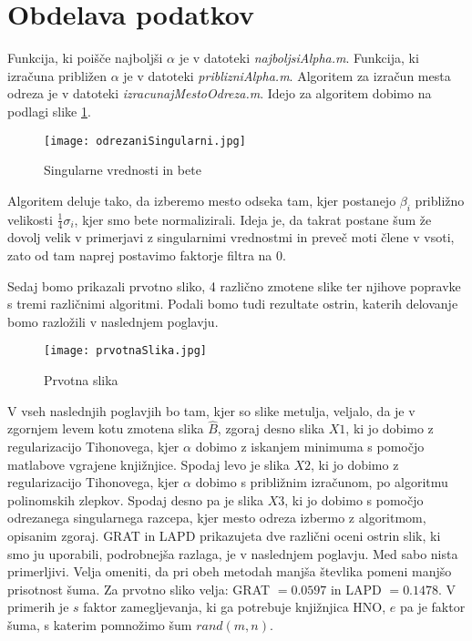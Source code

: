 \documentclass[a4paper,12pt]{article}
\begin{document}
\section{Obdelava podatkov}
Funkcija, ki poišče najboljši $\alpha$ je v datoteki \emph{najboljsiAlpha.m}. Funkcija, ki izračuna približen $\alpha$ je v datoteki \emph{priblizniAlpha.m}. Algoritem za izračun mesta odreza je v datoteki \emph{izracunajMestoOdreza.m}. Idejo za algoritem dobimo na podlagi  slike \ref{fig:sig}.
\begin{figure}[h]
	\texttt{[image: odrezaniSingularni.jpg]}
	\centering
	\caption{Singularne vrednosti in bete}
	\label{fig:sig}
\end{figure}
Algoritem deluje tako, da izberemo mesto odseka tam, kjer postanejo $\beta_i$ približno velikosti $\frac{1}{4}\sigma_i$, kjer smo bete normalizirali. Ideja je, da takrat postane šum že dovolj velik v primerjavi z singularnimi vrednostmi in preveč moti člene v vsoti, zato od tam naprej postavimo faktorje filtra na 0. 

Sedaj bomo prikazali prvotno sliko, 4 različno zmotene slike ter njihove popravke s tremi različnimi algoritmi. Podali bomo tudi rezultate ostrin, katerih delovanje bomo razložili v naslednjem poglavju.
\begin{figure}[h]
	\texttt{[image: prvotnaSlika.jpg]}
	\centering
	\caption{Prvotna slika}
	\label{fig:prvotnaSlika}
\end{figure}
V vseh naslednjih poglavjih bo tam, kjer so slike metulja, veljalo, da je v zgornjem levem kotu zmotena slika $\widehat{B}$, zgoraj desno slika $X1$, ki jo dobimo z regularizacijo Tihonovega, kjer $\alpha$ dobimo z iskanjem minimuma s pomočjo matlabove vgrajene knjižnjice. Spodaj levo je slika $X2$, ki jo dobimo z regularizacijo Tihonovega, kjer $\alpha$ dobimo s približnim izračunom, po algoritmu polinomskih zlepkov. Spodaj desno pa je slika $X3$, ki jo dobimo s pomočjo odrezanega singularnega razcepa, kjer mesto odreza izbermo z algoritmom, opisanim zgoraj. GRAT in LAPD prikazujeta dve različni oceni ostrin slik, ki smo ju uporabili, podrobnejša razlaga, je v naslednjem poglavju. Med sabo nista primerljivi. Velja omeniti, da pri obeh metodah manjša števlika pomeni manjšo prisotnost šuma. Za prvotno sliko velja: GRAT $=0.0597$ in LAPD $=0.1478$. V primerih je $s$ faktor zamegljevanja, ki ga potrebuje knjižnjica HNO, $e$ pa je faktor šuma, s katerim pomnožimo šum $rand(m,n)$.

\newpage
\end{document}
